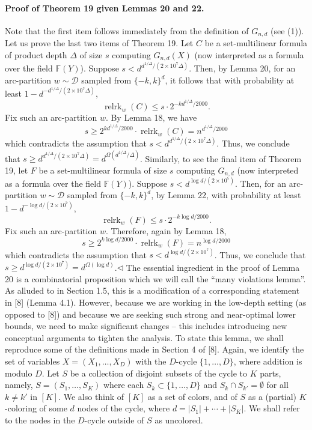 \paragraph{Proof of Theorem 19 given Lemmas 20 and 22.} Note that the first item follows immediately from the definition of $G_{n,d}$ (see (1)). Let us prove the last two items of Theorem 19. Let $C$ be a set-multilinear formula of product depth $\Delta$ of size $s$ computing $G_{n,d}(X)$ (now interpreted as a formula over the field $\mathbb F(Y)$). Suppose $s<d^{d^{1/\Delta}/(2\times10^7\Delta)}$. Then, by Lemma 20, for an arc-partition $w\sim\mathcal D$ sampled from $\{-k,k\}^d$, it follows that with probability at least $1-d^{-d^{1/\Delta}/(2\times10^7\Delta)}$,
\[\operatorname{relrk}_w(C)\leq s\cdot2^{-kd^{1/\Delta}/2000}.\]
Fix such an arc-partition $w$. By Lemma 18, we have
\[s\geq2^{kd^{1/\Delta}/2000}\cdot\operatorname{relrk}_w(C)=n^{d^{1/\Delta}/2000}\]
which contradicts the assumption that $s<d^{d^{1/\Delta}/(2\times10^7\Delta)}$. Thus, we conclude that $s\geq d^{d^{1/\Delta}/(2\times10^7\Delta)}=d^{\Omega(d^{1/\Delta}/\Delta)}$.
Similarly, to see the final item of Theorem 19, let $F$ be a set-multilinear formula of size $s$ computing $G_{n,d}$ (now interpreted as a formula over the field $\mathbb F(Y)$). Suppose $s<d^{\log d/(2\times10^7)}$. Then, for an arc-partition $w\sim\mathcal D$ sampled from $\{-k,k\}^d$, by Lemma 22, with probability at least $1-d^{-\log d/(2\times10^7)}$,
\[\operatorname{relrk}_w(F)\leq s\cdot2^{-k\log d/2000}.\]
Fix such an arc-partition $w$. Therefore, again by Lemma 18,
\[s\geq2^{k\log d/2000}\cdot\operatorname{relrk}_w(F)=n^{\log d/2000}\]
which contradicts the assumption that $s<d^{\log d/(2\times10^7)}$. Thus, we conclude that $s\geq d^{\log d/(2\times10^7)}=d^{\Omega(\log d)}$.\hfill$\triangleleft$
The essential ingredient in the proof of Lemma 20 is a combinatorial proposition which we will call the ``many violations lemma''. As alluded to in Section 1.5, this is a modification of a corresponding statement in [8] (Lemma 4.1). However, because we are working in the low-depth setting (as opposed to [8]) and because we are seeking such strong and near-optimal lower bounds, we need to make significant changes -- this includes introducing new conceptual arguments to tighten the analysis. To state this lemma, we shall reproduce some of the definitions made in Section 4 of [8].
Again, we identify the set of variables $X=(X_1,\ldots,X_D)$ with the $D$-cycle $\{1,\ldots,D\}$, where addition is modulo $D$. Let $S$ be a collection of disjoint subsets of the cycle to $K$ parts, namely, $S=(S_1,\ldots,S_K)$ where each $S_k\subset\{1,\ldots,D\}$ and $S_k\cap S_{k'}=\emptyset$ for all $k\neq k'$ in $[K]$. We also think of $[K]$ as a set of colors, and of $S$ as a (partial) $K$-coloring of some $d$ nodes of the cycle, where $d=|S_1|+\cdots+|S_K|$. We shall refer to the nodes in the $D$-cycle outside of $S$ as uncolored.
